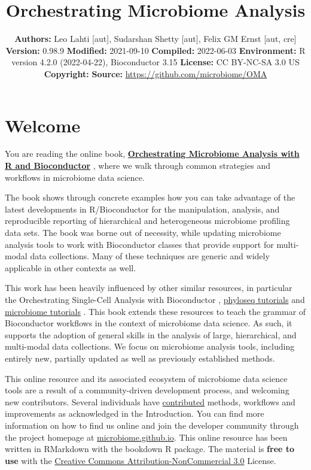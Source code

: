 \documentclass[
]{book}
\title{Orchestrating Microbiome Analysis}
\author{}
\date{\vspace{-2.5em}\textbf{Authors:} Leo Lahti {[}aut{]}, Sudarshan Shetty {[}aut{]}, Felix GM Ernst {[}aut, cre{]} \textbf{Version:} 0.98.9 \textbf{Modified:} 2021-09-10 \textbf{Compiled:} 2022-06-03 \textbf{Environment:} R version 4.2.0 (2022-04-22), Bioconductor 3.15 \textbf{License:} CC BY-NC-SA 3.0 US \textbf{Copyright:} \textbf{Source:} \url{https://github.com/microbiome/OMA}}
\begin{document}
\maketitle

{
\setcounter{tocdepth}{1}
\tableofcontents
}
\hypertarget{welcome}{%
\chapter*{Welcome}\label{welcome}}

You are reading the online book, \href{microbiome.github.io/OMA}{\textbf{Orchestrating Microbiome Analysis
with R and Bioconductor}} \citep{OMA}, where we
walk through common strategies and workflows in microbiome data
science.

The book shows through concrete examples how you can take advantage of
the latest developments in R/Bioconductor for the manipulation,
analysis, and reproducible reporting of hierarchical and heterogeneous
microbiome profiling data sets. The book was borne out of necessity,
while updating microbiome analysis tools to work with Bioconductor
classes that provide support for multi-modal data collections. Many of
these techniques are generic and widely applicable in other contexts
as well.

This work has been heavily influenced by other similar resources, in
particular the Orchestrating Single-Cell Analysis with Bioconductor
\citep{Amezquita2020natmeth}, \href{http://joey711.github.io/phyloseq/tutorials-index}{phyloseq
tutorials}
\citep{Callahan2016} and \href{https://microbiome.github.io/tutorials/}{microbiome
tutorials} \citep{Shetty2019}.
This book extends these resources to teach the grammar of Bioconductor
workflows in the context of microbiome data science. As such, it
supports the adoption of general skills in the analysis of large,
hierarchical, and multi-modal data collections. We focus on microbiome
analysis tools, including entirely new, partially updated as well as
previously established methods.

This online resource and its associated ecosystem of microbiome data
science tools are a result of a community-driven development process,
and welcoming new contributors. Several individuals have
\href{https://github.com/microbiome/OMA/graphs/contributors}{contributed}
methods, workflows and improvements as acknowledged in the
Introduction. You can find more information on how to find us online
and join the developer community through the project homepage at
\href{https://microbiome.github.io}{microbiome.github.io}. This online
resource has been written in RMarkdown with the bookdown R
package. The material is \textbf{free to use} with the \href{https://creativecommons.org/licenses/by-nc/3.0/us/}{Creative Commons
Attribution-NonCommercial
3.0} License.
\end{document}
